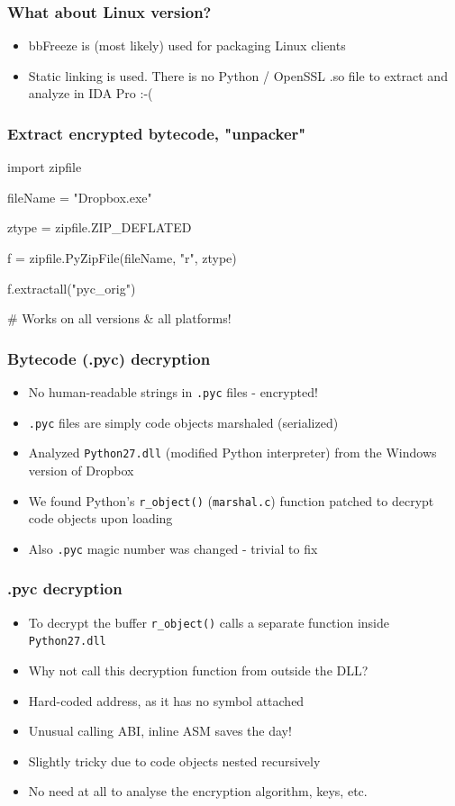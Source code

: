 \documentclass{beamer}
\newcommand\myfont{\fontsize{14}{20}\selectfont}
\begin{document}
\begin{frame}
\frametitle{What about Linux version?}
\myfont
\begin{itemize}
\itemsep 2em
\item bbFreeze is (most likely) used for packaging Linux clients

\item Static linking is used. There is no Python / OpenSSL .so file to extract
and analyze in IDA Pro :-(

\end{itemize}
\end{frame}

\begin{frame}[fragile]
\frametitle{Extract encrypted bytecode, "unpacker"}
\begin{python}
import zipfile

fileName = "Dropbox.exe"

ztype = zipfile.ZIP_DEFLATED

f = zipfile.PyZipFile(fileName, "r", ztype)

f.extractall("pyc_orig")

# Works on all versions & all platforms!
\end{python}
\end{frame}


\begin{frame}
	\frametitle{Bytecode (.pyc) decryption}
\begin{itemize}
\itemsep 2em
\item{No human-readable strings in \texttt{.pyc} files - encrypted!}
\item{\texttt{.pyc} files are simply code objects marshaled (serialized)}
\item{Analyzed \texttt{Python27.dll} (modified Python interpreter) from the Windows version of Dropbox}
\item{We found Python's \texttt{r\_object()} (\texttt{marshal.c}) function
patched to decrypt code objects upon loading}
\item{Also \texttt{.pyc} magic number was changed - trivial to fix}
\end{itemize}
\end{frame}

\begin{frame}
\frametitle{.pyc decryption}
\begin{itemize}
\itemsep 2em
\item{To decrypt the buffer \texttt{r\_object()} calls a separate function inside \texttt{Python27.dll}}
\item{Why not call this decryption function from outside the DLL?}
\item{Hard-coded address, as it has no symbol attached}
\item{Unusual calling ABI, inline ASM saves the day!}
\item{Slightly tricky due to code objects nested recursively}
\item{No need at all to analyse the encryption algorithm, keys, etc.}
\end{itemize}
\end{frame}
\end{document}
